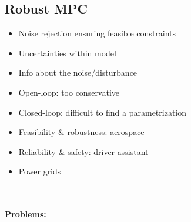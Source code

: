 \subsection{Robust MPC}
\begin{minipage}{0.33\textwidth}
    \begin{tcolorbox}[colframe=green!50!black, colback=green!5!white, title=Pros, left=0.5mm, right=0.5mm]
    \begin{itemize}[leftmargin=*]
        \item Noise rejection ensuring feasible constraints
        \item Uncertainties within model
    \end{itemize}
    \end{tcolorbox}
\end{minipage}
\begin{minipage}{0.33\textwidth}
    \begin{tcolorbox}[colframe=red!50!black, colback=red!5!white, title=Cons, left=0.5mm, right=0.5mm]
    \begin{itemize}[leftmargin=*]
        \item Info about the noise/disturbance
        \item Open-loop: too conservative
        \item Closed-loop: difficult to find a parametrization
    \end{itemize}
    \end{tcolorbox}
\end{minipage}
\begin{minipage}{0.33\textwidth}
    \begin{tcolorbox}[colframe=gray!50!black, colback=gray!5!white, title=Examples, left=0.5mm, right=0.5mm]
    \begin{itemize}[leftmargin=*]
        \item Feasibility \& robustness: aerospace
        \item Reliability \& safety: driver assistant
        \item Power grids
    \end{itemize}
    \end{tcolorbox}
\end{minipage}\\ \\
\textbf{Problems:}
